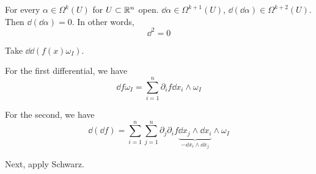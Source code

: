 \documentclass[12pt]{article}
\begin{document}
\begin{lemma}{}{}
    For every $\alpha \in \Omega^k(U)$ for $U \subset \mathbb{R}^n$ open. $\dd \alpha \in \Omega^{k+1}(U)$, $\dd (\dd \alpha) \in \Omega^{k+2}(U)$. Then $\dd (\dd \alpha) = 0$. In other words,
    \[
        \dd^2 = 0
    \]
\end{lemma}

\begin{proofbox}
    Take $\dd \dd (f(x) \omega_I)$.

    For the first differential, we have
    \[
        \dd f \omega_I = \sum_{i = 1}^{n} \partial_i f \dd x_i \land \omega_I
    \]

    For the second, we have
    \[
        \dd (\dd f) = \sum_{i = 1}^{n} \sum_{j = 1}^{n} \partial_j\partial_i f \underbrace{\dd x_j \land \dd x_i}_{- \dd x_i \land \dd x_j} \land \omega_I
    \]

    Next, apply Schwarz.
\end{proofbox}
\end{document}
